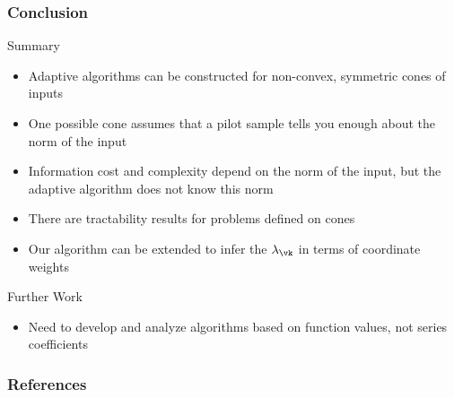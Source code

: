 \documentclass[10pt,compress,xcolor={usenames,dvipsnames},aspectratio=169]{beamer}
\begin{document}
\begin{frame}
	\frametitle{Conclusion}
	
	\vspace{-4ex}
	
	\alert{Summary}
	
	\vspace{-3ex}
	\begin{itemize}
		\item Adaptive algorithms can be constructed for non-convex, symmetric cones of inputs
		
		\item One possible cone assumes that a pilot sample tells you enough about the norm of the input
		
		\item Information cost and complexity depend on the norm of the input, but the adaptive algorithm does not  know this norm
		
		\item There are tractability results for problems defined on cones
		
		\item Our algorithm can be extended to infer the $\lambda_{\vk}$ in terms of coordinate weights
	\end{itemize}

\alert{Further Work}

	\vspace{-3ex}
	\begin{itemize}
	\item Need to develop and analyze algorithms based on function values, not series coefficients
	
\end{itemize}


\end{frame}





\thankyouframe

\begin{frame}[allowframebreaks]
	\frametitle{References}
\printbibliography
\end{frame}
\end{document}

